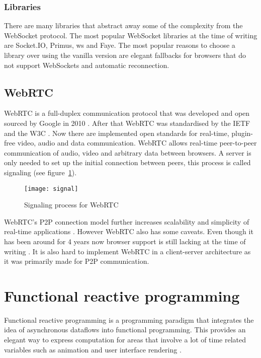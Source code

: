 \subsection{Libraries} %
\label{sub:websockets-implementations}

There are many libraries that abstract away some of the complexity from the WebSocket protocol. The most popular WebSocket libraries at the time of writing are Socket.IO, Primus, ws and Faye. The most popular reasons to choose a library over using the vanilla version are elegant fallbacks for browsers that do not support WebSockets and automatic reconnection.

\section{WebRTC} %
\label{sub:webrtc}

WebRTC is a full-duplex communication protocol that was developed and open sourced by Google in 2010 \cite{webrtc-intro}. After that WebRTC was standardised by the IETF and the W3C \cite{webrtc-intro}. Now there are implemented open standards for real-time, plugin-free video, audio and data communication. WebRTC allows real-time peer-to-peer communication of audio, video and arbitrary data between browsers. A server is only needed to set up the initial connection between peers, this process is called signaling \cite{webrtc} (see figure~\ref{figure:signal}).

\begin{figure}[H]
	\centering
	\texttt{[image: signal]}
	\caption{Signaling process for WebRTC \cite{webrtc-intro}}
	\label{figure:signal}
\end{figure}

WebRTC's P2P connection model further increases scalability and simplicity of real-time applications \cite{webrtc}. However WebRTC also has some caveats. Even though it has been around for 4 years now browser support is still lacking at the time of writing \cite{webrtc-browser}. It is also hard to implement WebRTC in a client-server architecture \cite{hn} as it was primarily made for P2P communication.

\chapter{Functional reactive programming} %
\label{sub:frp}

Functional reactive programming is a programming paradigm that integrates the idea of asynchronous dataflows into functional programming. This provides an elegant way to express computation for areas that involve a lot of time related variables such as animation and user interface rendering \cite{frp-wiki}\cite{frp-haskell}. 


